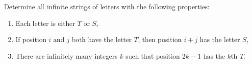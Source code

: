 Determine all infinite strings of letters with the following properties:
\begin{enumerate}[label=(\alph*)]
	\item Each letter is either $T$ or $S$,
	\item If position $i$ and $j$ both have the letter $T$, then position $i+j$ has the letter $S$,
	\item There are infinitely many integers $k$ such that position $2k-1$ has the $k$th $T$.
\end{enumerate}